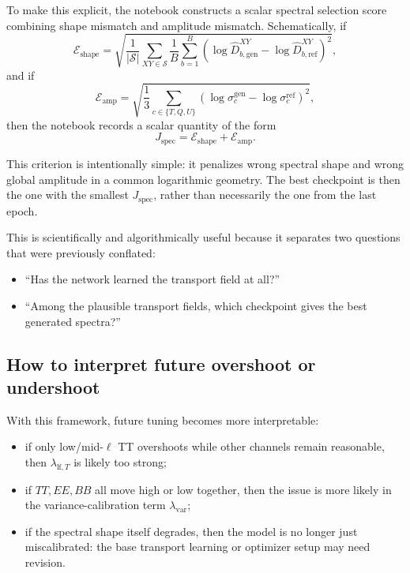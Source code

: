 \documentclass[11pt]{article}
\begin{document}
To make this explicit, the notebook constructs a scalar spectral selection score combining shape mismatch and amplitude mismatch. Schematically, if
\begin{equation}
  \mathcal{E}_{\mathrm{shape}}
  =
  \sqrt{
    \frac{1}{|\mathcal{S}|}
    \sum_{XY\in\mathcal{S}}
    \frac{1}{B}
    \sum_{b=1}^{B}
    \left(
      \log \widehat D_{b,\mathrm{gen}}^{XY}
      -
      \log \widehat D_{b,\mathrm{ref}}^{XY}
    \right)^2
  },
\end{equation}
and if
\begin{equation}
  \mathcal{E}_{\mathrm{amp}}
  =
  \sqrt{
    \frac{1}{3}
    \sum_{c\in\{T,Q,U\}}
    \left(
      \log \sigma^{\mathrm{gen}}_c
      -
      \log \sigma^{\mathrm{ref}}_c
    \right)^2
  },
\end{equation}
then the notebook records a scalar quantity of the form
\begin{equation}
  J_{\mathrm{spec}}
  =
  \mathcal{E}_{\mathrm{shape}} + \mathcal{E}_{\mathrm{amp}}.
\end{equation}

This criterion is intentionally simple: it penalizes wrong spectral shape and wrong global amplitude in a common logarithmic geometry. The best checkpoint is then the one with the smallest \(J_{\mathrm{spec}}\), rather than necessarily the one from the last epoch.

This is scientifically and algorithmically useful because it separates two questions that were previously conflated:
\begin{itemize}[leftmargin=1.5em]
  \item ``Has the network learned the transport field at all?''
  \item ``Among the plausible transport fields, which checkpoint gives the best generated spectra?''
\end{itemize}

\subsection{How to interpret future overshoot or undershoot}

With this framework, future tuning becomes more interpretable:
\begin{itemize}[leftmargin=1.5em]
  \item if only low/mid-\(\ell\) TT overshoots while other channels remain reasonable, then \(\lambda_{\mathrm{lf},T}\) is likely too strong;
  \item if \(TT,EE,BB\) all move high or low together, then the issue is more likely in the variance-calibration term \(\lambda_{\mathrm{var}}\);
  \item if the spectral shape itself degrades, then the model is no longer just miscalibrated: the base transport learning or optimizer setup may need revision.
\end{itemize}
\end{document}
